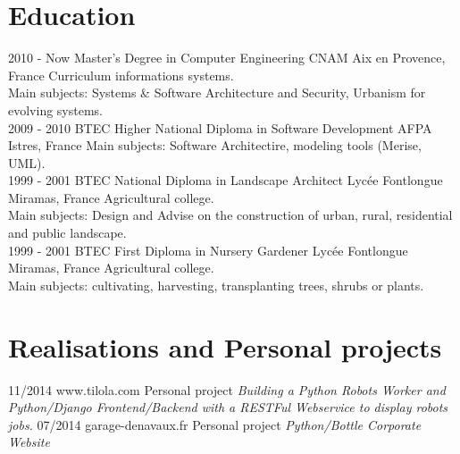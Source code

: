\documentclass[]{friggeri-cv}
\begin{document}
\section{Education}
\begin{entrylist}
  \entry
    {2010 - Now}
    {Master's Degree in Computer Engineering}
    {CNAM Aix en Provence, France}
    {Curriculum informations systems.\\
    Main subjects: Systems \& Software Architecture and Security, Urbanism for evolving systems.\\}
  \entry
    {2009 - 2010}
    {BTEC Higher National Diploma in Software Development}
    {AFPA Istres, France}
    {Main subjects: Software Architectire, modeling tools (Merise, UML).\\}
  \entry
    {1999 - 2001}
    {BTEC National Diploma in Landscape Architect}
    {Lycée Fontlongue Miramas, France}
    {Agricultural college.\\
    Main subjects: Design and Advise on the construction of urban, rural, residential and public landscape.\\}
  \entry
    {1999 - 2001}
    {BTEC First Diploma in Nursery Gardener}
    {Lycée Fontlongue Miramas, France}
    {Agricultural college.\\
    Main subjects: cultivating, harvesting, transplanting trees, shrubs or plants.}
\end{entrylist}

\section{Realisations and Personal projects}
\begin{entrylist}
  \entry
    {11/2014}
    {www.tilola.com}
    {Personal project}
    {\emph{Building a Python Robots Worker and Python/Django Frontend/Backend with a RESTFul Webservice to display robots jobs. }}
  \entry
    {07/2014}
    {garage-denavaux.fr}
    {Personal project}
    {\emph{Python/Bottle Corporate Website}}
\end{entrylist}
\end{document}
